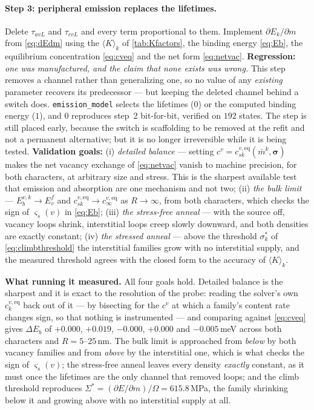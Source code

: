 \documentclass{article}
\newcommand{\code}[1]{\texttt{#1}}
\begin{document}
\paragraph{Step 3: peripheral emission replaces the lifetimes.} Delete
$\tau_{avL}$ and $\tau_{cvL}$ and every term proportional to them. Implement
$\partial E_k/\partial m$ from \cref{eq:dEdm} using the $\langle K\rangle_k$ of
\cref{tab:Kfactors}, the binding energy \cref{eq:Eb}, the equilibrium
concentration \cref{eq:cveq} and the net form \cref{eq:netvac}.
\textbf{Regression:} \emph{one was manufactured, and the claim that none exists
was wrong.} This step removes a channel rather than generalizing one, so no
value of any \emph{existing} parameter recovers its predecessor --- but keeping
the deleted channel behind a switch does. \code{emission\_model} selects the
lifetimes ($0$) or the computed binding energy ($1$), and $0$ reproduces step~2
bit-for-bit, verified on $192$ states. The step is still placed early, because
the switch is scaffolding to be removed at the refit and not a permanent
alternative; but it is no longer irreversible while it is being tested.
\textbf{Validation goals:} (i) \emph{detailed balance} --- setting
$c^v=c^{v,\mathrm{eq}}_{sk}(\bar m^k,\bm\sigma)$ makes the net vacancy exchange
of \cref{eq:netvac} vanish to machine precision, for both characters, at
arbitrary size and stress. This is the sharpest available test that emission and
absorption are one mechanism and not two; (ii) \emph{the bulk limit} ---
$E^{v,k}_b\to E^f_v$ and $c^{v,\mathrm{eq}}_{sk}\to c^{v,\mathrm{eq}}_\infty$ as
$R\to\infty$, from both characters, which checks the sign of $\varsigma_s(v)$ in
\cref{eq:Eb}; (iii) \emph{the stress-free anneal} --- with the source off,
vacancy loops shrink, interstitial loops creep slowly downward, and both
densities are exactly constant; (iv) \emph{the stressed anneal} --- above the
threshold $\sigma^\ast_k$ of \cref{eq:climbthreshold} the interstitial families
grow with no interstitial supply, and the measured threshold agrees with the
closed form to the accuracy of $\langle K\rangle_k$.

\textbf{What running it measured.} All four goals hold. Detailed balance is the
sharpest and it is exact to the resolution of the probe: reading the solver's
own $c^{v,\mathrm{eq}}_k$ back out of it --- by bisecting for the $c^v$ at which
a family's content rate changes sign, so that nothing is instrumented --- and
comparing against \cref{eq:cveq} gives $\Delta E_b$ of $+0.000$, $+0.019$,
$-0.000$, $+0.000$ and $-0.005\,$meV across both characters and
$R=5$--$25\,$nm. The bulk limit is approached from \emph{below} by both vacancy
families and from \emph{above} by the interstitial one, which is what checks the
sign of $\varsigma_s(v)$; the stress-free anneal leaves every density
\emph{exactly} constant, as it must once the lifetimes are the only channel that
removed loops; and the climb threshold reproduces
$\Sigma^\ast=(\partial E/\partial m)/\Omega=615.8\,$MPa, the family shrinking
below it and growing above with no interstitial supply at all.
\end{document}
